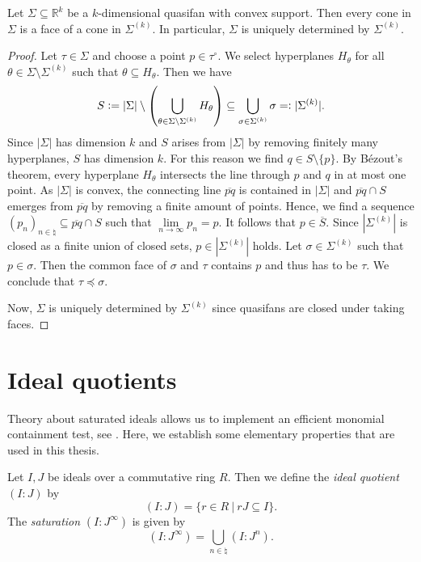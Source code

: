 \begin{lemmaApp}
	\label{lemma:convex_fan_maximal_cones}
	Let $\Sigma\subseteq\mathbb{R}^k$ be a $k$-dimensional quasifan with convex support. Then every cone in $\Sigma$ is a face of a cone in $\Sigma^{(k)}$. In particular, $\Sigma$ is uniquely determined by $\Sigma^{(k)}$.
\end{lemmaApp}
\begin{proof}
	Let $\tau\in\Sigma$ and choose a point $p\in\tau^\circ$. We select hyperplanes $H_\theta$ for all $\theta\in\Sigma\setminus\Sigma^{(k)}$ such that $\theta\subseteq H_\theta$. Then we have
	$$S \mathrel{\mathop:}= |\Sigma| \setminus \left(\bigcup_{\theta\in\Sigma\setminus\Sigma^{(k)}} H_\theta\right) \subseteq \bigcup_{\sigma\in\Sigma^{(k)}} \sigma =\mathrel{\mathop:} |\Sigma^{(k)}|.$$
	Since $|\Sigma|$ has dimension $k$ and $S$ arises from $|\Sigma|$ by removing finitely many hyperplanes, $S$ has dimension $k$. For this reason we find $q\in S \setminus\{p\}$. By Bézout's theorem, every hyperplane $H_\theta$ intersects the line through $p$ and $q$ in at most one point. As $|\Sigma|$ is convex, the connecting line $\overline{pq}$ is contained in $|\Sigma|$ and $\overline{pq} \cap S$ emerges from $\overline{pq}$ by removing a finite amount of points. Hence, we find a sequence $(p_n)_{n\in\natural}\subseteq \overline{pq} \cap S$ such that $\lim\limits_{n\rightarrow\infty} p_n = p$. It follows that $p\in\overline{S}$. Since $|\Sigma^{(k)}|$ is closed as a finite union of closed sets, $p\in|\Sigma^{(k)}|$ holds. Let $\sigma\in\Sigma^{(k)}$ such that $p\in\sigma$. Then the common face of $\sigma$ and $\tau$ contains $p$ and thus has to be $\tau$. We conclude that $\tau\preceq\sigma$.
	
	Now, $\Sigma$ is uniquely determined by $\Sigma^{(k)}$ since quasifans are closed under taking faces.
\end{proof}

\chapter{Ideal quotients}
\label{appendix:ideal_quotients}

Theory about saturated ideals allows us to implement an efficient monomial containment test, see \cite{gitfan_symmetry}. Here, we establish some elementary properties that are used in this thesis.

\begin{defiApp}
	Let $I,J$ be ideals over a commutative ring $R$. Then we define the \emph{ideal quotient} $(I:J)$ by
	$$(I:J) = \{r\in R\ |\ rJ\subseteq I\}.$$
	The \emph{saturation} $(I:J^\infty)$ is given by
	$$(I:J^\infty) = \bigcup_{n\in \natural}(I:J^n).$$
\end{defiApp}

